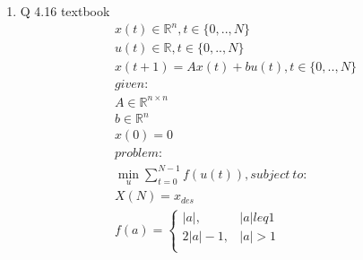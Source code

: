 \documentclass[12pt,letter]{article}
\newcommand{\R}{\mathbb{R}}
\newcommand{\norm}[1]{\|#1\|}
\begin{document}
\begin{enumerate}
    (e) Minimize $\norm{Ax-b}_1 + \norm{x}_{\infty}$
    \begin{align*}
      let\ t_i = |Ax-b|_i\\
      let\ v = max |x_i|\\
      \min_{t,v,x} \sum_i t_i + v, subject\ to:\\
      |x_i| \leq v, \forall i\\
      |Ax-b|_i \leq t_i, \forall i
    \end{align*}
    LP formulation:
    \begin{align*}
      x, t \in R^n, v \in R\\
      \min_{t,v,x} 1^T t + v, subject\ to:\\
      x_i - v \leq 0, \forall i\\
      -x_i - v \leq 0, \forall i\\
      A_{i,:}x -  t_i \leq + b_i, \forall i\\
      -A_{i,:}x - t_i \leq - b_i, \forall i\\
    \end{align*}

\item Q 4.16 textbook
  \begin{align*}
    x(t) \in \R^n, t \in \{0,..,N\}\\
    u(t) \in \R, t \in \{0,..,N\}\\
    x(t+1) = Ax(t) + bu(t), t \in \{0,..,N\}\\
    given:\\
    A\in\R^{n \times n}\\
    b \in \R^n\\
    x(0) = 0\\
    problem:\\
    \min_u \sum_{t=0}^{N-1} f(u(t)), subject\ to:\\
    X(N) = x_{des}\\
    f(a) = 
    \begin{cases}
      |a|, & |a| leq 1\\
      2|a| - 1, & |a| > 1\\
    \end{cases}\\
  \end{align*}
  
  \pagebreak
  

\end{enumerate}
\end{document}
